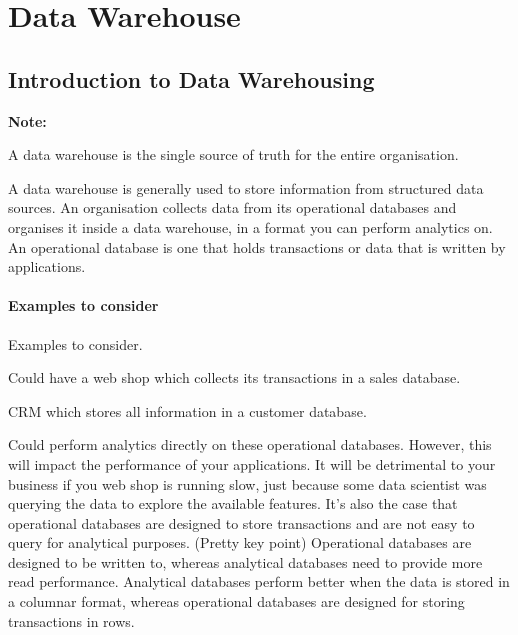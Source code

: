 \documentclass[a4paper, 11pt]{book}
\newenvironment{note}{
    \begin{siderule}
        \textbf{Note: }
        }{
    \end{siderule}}
\begin{document}


    \section{Data Warehouse}


    \subsection{Introduction to Data Warehousing}

    \begin{note}
        A data warehouse is the single source of truth for the entire organisation.
    \end{note}

    A data warehouse is generally used to store information from structured data sources.
    An organisation collects data from its operational databases and organises it inside a data warehouse, in a format you can perform analytics on.
    An operational database is one that holds transactions or data that is written by applications.

    \paragraph{Examples to consider}
    Examples to consider.
    \begin{item}
        \item Could have a web shop which collects its transactions in a sales database.
        \item CRM which stores all information in a customer database.
    \end{item}

    Could perform analytics directly on these operational databases.
    However, this will impact the performance of your applications.
    It will be detrimental to your business if you web shop is running slow, just because some data scientist was querying the data to explore the available features.
    It's also the case that operational databases are designed to store transactions and are not easy to query for analytical purposes. (Pretty key point)
    Operational databases are designed to be written to, whereas analytical databases need to provide more read performance.
    Analytical databases perform better when the data is stored in a columnar format, whereas operational databases are designed for storing transactions in rows.
\end{document}

